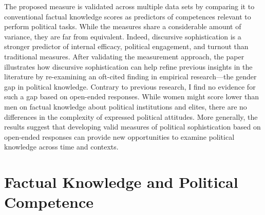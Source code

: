\documentclass[12pt]{article}
\begin{document}
The proposed measure is validated across multiple data sets by comparing it to conventional factual knowledge scores as predictors of competences relevant to perform political tasks. While the measures share a considerable amount of variance, they are far from equivalent. Indeed, discursive sophistication is a stronger predictor of internal efficacy, political engagement, and turnout than traditional measures. After validating the measurement approach, the paper illustrates how discursive sophistication can help refine previous insights in the literature by re-examining an oft-cited finding in empirical research---the gender gap in political knowledge. Contrary to previous research, I find no evidence for such a gap based on open-ended responses. While women might score lower than men on factual knowledge about political institutions and elites, there are no differences in the complexity of expressed political attitudes. More generally, the results suggest that developing valid measures of political sophistication based on open-ended responses can provide new opportunities to examine political knowledge across time and contexts. 


\section*{Factual Knowledge and Political Competence}

\end{document}
